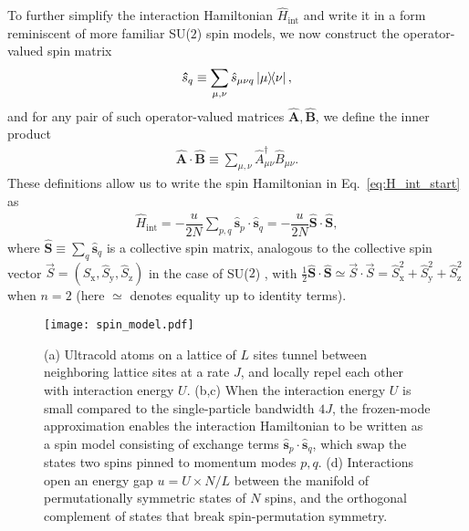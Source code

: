 \documentclass[aps,pra,nofootinbib,twocolumn,superscriptaddress]{revtex4-2}
\renewcommand{\t}{\text} %
\newcommand{\f}[2]{\dfrac{#1}{#2}} %
\renewcommand{\v}{\bm} %
\newcommand{\1}{\mathds{1}}
\newcommand{\s}{\hat s}
\renewcommand{\H}{\hat H}
\renewcommand{\S}{\hat S}
\newcommand{\x}{\text{x}}
\newcommand{\y}{\text{y}}
\newcommand{\z}{\text{z}}
\begin{document}
To further simplify the interaction Hamiltonian $\H_{\t{int}}$ and write it in a form reminiscent of more familiar SU($2$) spin models, we now construct the operator-valued spin matrix
\begin{align}
  \v\s_q \equiv \sum_{\mu,\nu} \s_{\mu\nu q} \op{\mu}{\nu},
\end{align}
and for any pair of such operator-valued matrices $\v{\hat{A}},\v{\hat{B}}$, we define the inner product
\begin{align}
  \v{\hat{A}} \cdot \v{\hat{B}}
  \equiv \sum_{\mu,\nu} \hat A_{\mu\nu}^\dag \hat B_{\mu\nu}.
  \label{eq:dot_product}
\end{align}
These definitions allow us to write the spin Hamiltonian in Eq.~\eqref{eq:H_int_start} as
\begin{align}
  \H_{\t{int}} = -\f{u}{2N} \sum_{p,q} \v\s_p\cdot\v\s_q
  = -\f{u}{2N}\v\S\cdot\v\S,
  \label{eq:H_int}
\end{align}
where $\v\S\equiv\sum_q\v\s_q$ is a collective spin matrix, analogous to the collective spin vector $\vec S=(\S_\x,\S_\y,\S_\z)$ in the case of SU($2$) \cite{he2019engineering}, with $\frac12\v\S\cdot\v\S \simeq \vec S\cdot\vec S = \S_\x^2 + \S_\y^2 + \S_\z^2$ when $n=2$ (here $\simeq$ denotes equality up to identity terms).

\begin{figure}
\centering
\texttt{[image: spin\_model.pdf]}
\caption{
(a) Ultracold atoms on a lattice of $L$ sites tunnel between neighboring lattice sites at a rate $J$, and locally repel each other with interaction energy $U$.
(b,c) When the interaction energy $U$ is small compared to the single-particle bandwidth $4J$, the frozen-mode approximation enables the interaction Hamiltonian to be written as a spin model consisting of exchange terms $\v\s_p\cdot\v\s_q$, which swap the states two spins pinned to momentum modes $p,q$.
(d) Interactions open an energy gap $u=U\times N/L$ between the manifold of permutationally symmetric states of $N$ spins, and the orthogonal complement of states that break spin-permutation symmetry.
}
\label{fig:spin_model}
\end{figure}
\end{document}
